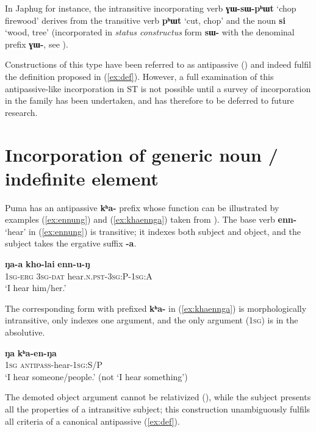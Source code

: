 \documentclass[oneside,a4paper,11pt]{article}
\newcommand{\ipa}[1]{{\phon\textbf{#1}}}
\begin{document}
In Japhug for instance, the intransitive incorporating verb \ipa{ɣɯ-sɯ-pʰɯt} `chop firewood' derives from the transitive verb \ipa{pʰɯt} `cut, chop' and the noun  \ipa{si} `wood, tree' (incorporated in \textit{status constructus} form \ipa{sɯ-} with the denominal prefix \ipa{ɣɯ-}, see  \citealt{jacques12incorp}). 

Constructions of this type have been referred to as antipassive (\citealt[47-48]{say09antipassive}) and indeed fulfil the definition proposed in (\ref{ex:def}). However, a full examination of this antipassive-like incorporation in ST is not possible until a survey of incorporation in the family has been undertaken, and has therefore to be deferred to future research.

 
\section{Incorporation of generic noun / indefinite element} \label{sec:kha}
Puma has an antipassive \ipa{kʰa-} prefix whose function can be illustrated by examples (\ref{ex:ennung}) and (\ref{ex:khaennga}) taken from \citet[7-9]{bickel07puma}). The base verb \ipa{enn-} `hear' in (\ref{ex:ennung}) is transitive; it indexes both subject and object, and the subject takes the ergative suffix \ipa{-a}.

\begin{exe}
\ex \label{ex:ennung}
\gll 
\ipa{ŋa-a} \ipa{kho-lai} \ipa{enn-u-ŋ} \\
\textsc{1sg-erg} \textsc{3sg-dat} hear.\textsc{n.pst}-\textsc{3sg:P-1sg:A} \\
\glt `I hear him/her.'
\end{exe}

The corresponding form with prefixed \ipa{kʰa-} in (\ref{ex:khaennga}) is morphologically intransitive, only indexes one argument, and the only argument (\textsc{1sg}) is in the absolutive. 

\begin{exe}
\ex \label{ex:khaennga}
\gll 
\ipa{ŋa} \ipa{kʰa-en-ŋa} \\
\textsc{1sg} \textsc{antipass}-hear-\textsc{1sg}:S/P \\
\glt `I hear someone/people.' (not `I hear something')
\end{exe}
 
The demoted object argument cannot be relativized (\citealt[10]{bickel07puma}), while the subject presents all the properties of a intransitive subject; this construction unambiguously fulfils all criteria of a canonical antipassive (\ref{ex:def}). 
\end{document}
